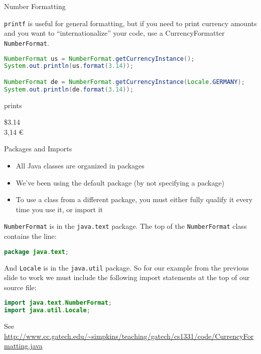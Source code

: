 \documentclass{beamer}
\begin{document}
\begin{frame}[fragile]{Number Formatting}


{\tt printf} is useful for general formatting, but if you need to print currency amounts and you want to ``internationalize'' your code, use a CurrencyFormatter {\tt NumberFormat}.

\begin{lstlisting}[language=Java]
NumberFormat us = NumberFormat.getCurrencyInstance();
System.out.println(us.format(3.14));

NumberFormat de = NumberFormat.getCurrencyInstance(Locale.GERMANY);
System.out.println(de.format(3.14));     
\end{lstlisting}
prints\\
\begin{framed}
\$3.14\\
3,14 \euro
\end{framed}
 


\end{frame}

\begin{frame}[fragile]{Packages and Imports}
\vspace{-.1in}
\begin{itemize}
\item All Java classes are organized in packages
\item We've been using the default package (by not specifying a package)
\item To use a class from a different package, you must either fully qualify it every time you use it, or import it
\end{itemize}
{\tt NumberFormat} is in the {\tt java.text} package.  The top of the {\tt NumberFormat} class contains the line:
\begin{lstlisting}[language=Java]
package java.text;
\end{lstlisting}
 And {\tt Locale} is in the {\tt java.util} package.  So for our example from the previous slide to work we must include the following import statements at the top of our source file:
\begin{lstlisting}[language=Java]
import java.text.NumberFormat;
import java.util.Locale;
\end{lstlisting}
\vspace{-.1in}
See \url{http://www.cc.gatech.edu/~simpkins/teaching/gatech/cs1331/code/CurrencyFormatting.java}
\end{frame}
\end{document}

